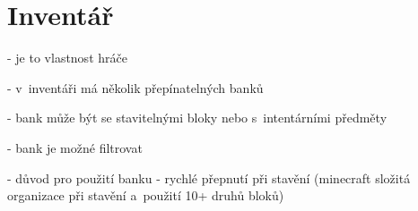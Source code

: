 
\section{Inventář}

- je to vlastnost hráče

- v~inventáři má několik přepínatelných banků

- bank může být se stavitelnými bloky nebo s~intentárními předměty

- bank je možné filtrovat

- důvod pro použití banku - rychlé přepnutí při stavění (minecraft složitá organizace při stavění a~použití 10+ druhů bloků)